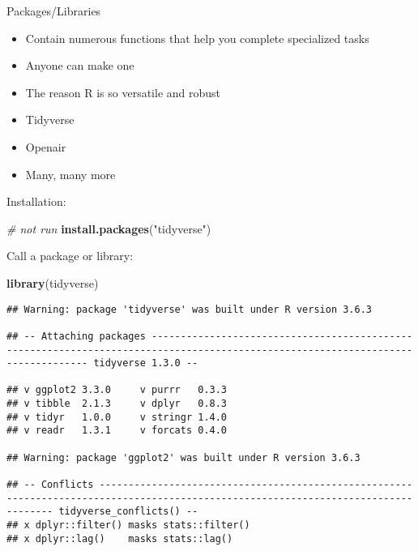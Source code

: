 \documentclass[ignorenonframetext,]{beamer}
\newenvironment{Shaded}{\begin{snugshade}}{\end{snugshade}}
\newcommand{\KeywordTok}[1]{\textcolor[rgb]{0.13,0.29,0.53}{\textbf{#1}}}
\newcommand{\StringTok}[1]{\textcolor[rgb]{0.31,0.60,0.02}{#1}}
\newcommand{\CommentTok}[1]{\textcolor[rgb]{0.56,0.35,0.01}{\textit{#1}}}
\newcommand{\NormalTok}[1]{#1}
\providecommand{\tightlist}{%
  \setlength{\itemsep}{0pt}\setlength{\parskip}{0pt}}
\begin{document}
\begin{frame}[fragile]{Packages/Libraries}

\begin{itemize}
\tightlist
\item
  Contain numerous functions that help you complete specialized tasks
\item
  Anyone can make one
\item
  The reason R is so versatile and robust
\item
  Tidyverse
\item
  Openair
\item
  Many, many more
\end{itemize}

\begin{block}{Installation:}

\begin{Shaded}
\begin{Highlighting}[]
\CommentTok{# not run}
\KeywordTok{install.packages}\NormalTok{(}\StringTok{"tidyverse"}\NormalTok{)}
\end{Highlighting}
\end{Shaded}

\end{block}

\begin{block}{Call a package or library:}

\begin{Shaded}
\begin{Highlighting}[]
\KeywordTok{library}\NormalTok{(tidyverse)}
\end{Highlighting}
\end{Shaded}

\begin{verbatim}
## Warning: package 'tidyverse' was built under R version 3.6.3

## -- Attaching packages --------------------------------------------------------------------------------------------------------------------------------- tidyverse 1.3.0 --

## v ggplot2 3.3.0     v purrr   0.3.3
## v tibble  2.1.3     v dplyr   0.8.3
## v tidyr   1.0.0     v stringr 1.4.0
## v readr   1.3.1     v forcats 0.4.0

## Warning: package 'ggplot2' was built under R version 3.6.3

## -- Conflicts ------------------------------------------------------------------------------------------------------------------------------------ tidyverse_conflicts() --
## x dplyr::filter() masks stats::filter()
## x dplyr::lag()    masks stats::lag()
\end{verbatim}

\end{block}

\end{frame}
\end{document}
